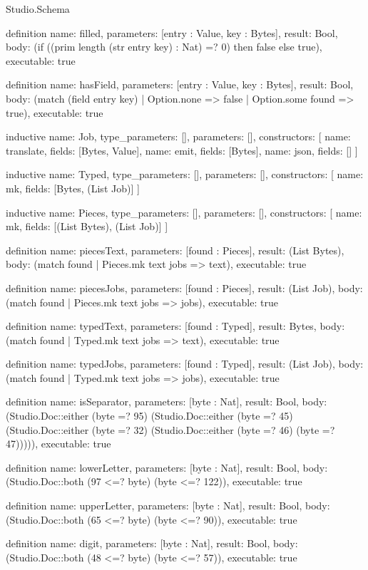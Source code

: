 \begin{lexlean}{Studio.Schema}
\begin{semanticmodule}
definition{
  name: filled,
  parameters: [entry : Value, key : Bytes],
  result: Bool,
  body: (if ((prim length (str entry key) : Nat) =? 0) then false else true),
  executable: true
}

definition{
  name: hasField,
  parameters: [entry : Value, key : Bytes],
  result: Bool,
  body: (match (field entry key)
    | Option.none => false
    | Option.some found => true),
  executable: true
}

inductive{
  name: Job,
  type_parameters: [],
  parameters: [],
  constructors: [
    {name: translate, fields: [Bytes, Value]},
    {name: emit, fields: [Bytes]},
    {name: json, fields: []}
  ]
}

inductive{
  name: Typed,
  type_parameters: [],
  parameters: [],
  constructors: [
    {name: mk, fields: [Bytes, (List Job)]}
  ]
}

inductive{
  name: Pieces,
  type_parameters: [],
  parameters: [],
  constructors: [
    {name: mk, fields: [(List Bytes), (List Job)]}
  ]
}

definition{
  name: piecesText,
  parameters: [found : Pieces],
  result: (List Bytes),
  body: (match found
    | Pieces.mk text jobs => text),
  executable: true
}

definition{
  name: piecesJobs,
  parameters: [found : Pieces],
  result: (List Job),
  body: (match found
    | Pieces.mk text jobs => jobs),
  executable: true
}

definition{
  name: typedText,
  parameters: [found : Typed],
  result: Bytes,
  body: (match found
    | Typed.mk text jobs => text),
  executable: true
}

definition{
  name: typedJobs,
  parameters: [found : Typed],
  result: (List Job),
  body: (match found
    | Typed.mk text jobs => jobs),
  executable: true
}

definition{
  name: isSeparator,
  parameters: [byte : Nat],
  result: Bool,
  body: (Studio.Doc::either (byte =? 95) (Studio.Doc::either (byte =? 45) (Studio.Doc::either (byte =? 32) (Studio.Doc::either (byte =? 46) (byte =? 47))))),
  executable: true
}

definition{
  name: lowerLetter,
  parameters: [byte : Nat],
  result: Bool,
  body: (Studio.Doc::both (97 <=? byte) (byte <=? 122)),
  executable: true
}

definition{
  name: upperLetter,
  parameters: [byte : Nat],
  result: Bool,
  body: (Studio.Doc::both (65 <=? byte) (byte <=? 90)),
  executable: true
}

definition{
  name: digit,
  parameters: [byte : Nat],
  result: Bool,
  body: (Studio.Doc::both (48 <=? byte) (byte <=? 57)),
  executable: true
}


\end{semanticmodule}
\end{lexlean}
